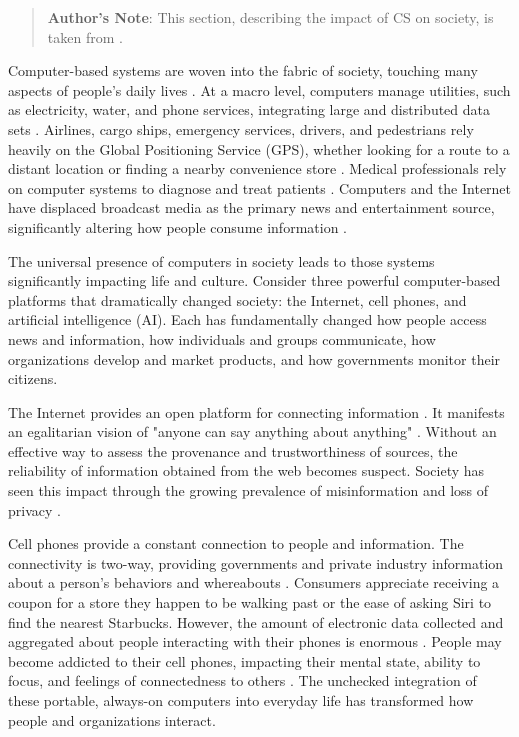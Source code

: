 \begin{quotation}
\textbf{Author's Note}: This section, describing the impact of CS on society, is taken from \cite{read_why_nodate}.
\end{quotation}

Computer-based systems are woven into the fabric of society, touching many aspects of people's daily lives \parencite{koya_measuring_2020}. At a macro level, computers manage utilities, such as electricity, water, and phone services, integrating large and distributed data sets \parencite{koya_measuring_2020}. Airlines, cargo ships, emergency services, drivers, and pedestrians rely heavily on the Global Positioning Service (GPS), whether looking for a route to a distant location or finding a nearby convenience store \parencite{mcneff_global_2002}. Medical professionals rely on computer systems to diagnose and treat patients \parencite{cirillo_sex_2020}. Computers and the Internet have displaced broadcast media as the primary news and entertainment source, significantly altering how people consume information \parencite{chalaby_television_2016}.

The universal presence of computers in society leads to those systems significantly impacting life and culture. Consider three powerful computer-based platforms that dramatically changed society: the Internet, cell phones, and artificial intelligence (AI). Each has fundamentally changed how people access news and information, how individuals and groups communicate, how organizations develop and market products, and how governments monitor their citizens.


The Internet provides an open platform for connecting information \parencite{berners-lee_world-wide_2010}. It manifests an egalitarian vision of "anyone can say anything about anything" \parencite{noauthor_resource_nodate}. Without an effective way to assess the provenance and trustworthiness of sources, the reliability of information obtained from the web becomes suspect. Society has seen this impact through the growing prevalence of misinformation and loss of privacy \parencite{berners-lee_we_2014,zhou_survey_2020}. 


Cell phones provide a constant connection to people and information. The connectivity is two-way, providing governments and private industry information about a person's behaviors and whereabouts \parencite{dienlin_is_2015}. Consumers appreciate receiving a coupon for a store they happen to be walking past or the ease of asking Siri to find the nearest Starbucks. However, the amount of electronic data collected and aggregated about people interacting with their phones is enormous \parencite{dienlin_is_2015}. People may become addicted to their cell phones, impacting their mental state, ability to focus, and feelings of connectedness to others \parencite{de-sola_gutierrez_cell-phone_2016}. The unchecked integration of these portable, always-on computers into everyday life has transformed how people and organizations interact.

